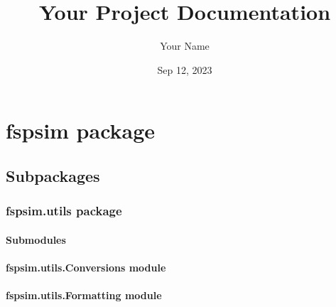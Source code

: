 \documentclass[letterpaper,10pt,english]{sphinxmanual}
\title{Your Project Documentation}
\date{Sep 12, 2023}
\author{Your Name}
\begin{document}
\pagestyle{empty}
\sphinxmaketitle
\pagestyle{plain}
\sphinxtableofcontents
\pagestyle{normal}
\label{\detokenize{index::doc}}


\sphinxstepscope


\chapter{fspsim package}
\label{\detokenize{fspsim:fspsim-package}}\label{\detokenize{fspsim::doc}}

\section{Subpackages}
\label{\detokenize{fspsim:subpackages}}
\sphinxstepscope


\subsection{fspsim.utils package}
\label{\detokenize{fspsim.utils:fspsim-utils-package}}\label{\detokenize{fspsim.utils::doc}}

\subsubsection{Submodules}
\label{\detokenize{fspsim.utils:submodules}}

\subsubsection{fspsim.utils.Conversions module}
\label{\detokenize{fspsim.utils:fspsim-utils-conversions-module}}

\subsubsection{fspsim.utils.Formatting module}
\label{\detokenize{fspsim.utils:module-fspsim.utils.Formatting}}\label{\detokenize{fspsim.utils:fspsim-utils-formatting-module}}
\end{document}
